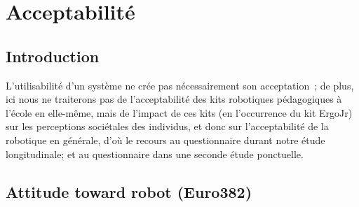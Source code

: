 \clearpage
\section{Acceptabilité}\label{Exp:L_ACC}
    \subsection{Introduction}
        L’utilisabilité d’un système ne crée pas nécessairement son acceptation~; de plus, ici nous ne traiterons pas de l'acceptabilité des kits robotiques pédagogiques à l'école en elle-même, mais de l'impact de ces kits (en l'occurrence du kit ErgoJr) sur les perceptions sociétales des individus, et donc sur l'acceptabilité de la robotique en générale, d'où le recours au questionnaire  durant notre étude longitudinale; et au questionnaire  dans une seconde étude ponctuelle.
    \subsection{Attitude toward robot (Euro382)}\label{Exp:euro}
